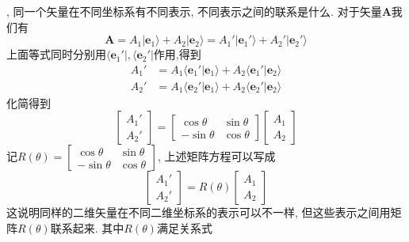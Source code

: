 \documentclass[a4paper,11pt]{book}
\begin{document}
, 同一个矢量在不同坐标系有不同表示, 不同表示之间的联系是什么. 对于矢量$\mathbf{A}$我们有
\begin{equation*}
  \mathbf{A}=A_1|\mathbf{e}_1\rangle+A_2|\mathbf{e}_2\rangle=A_1'|\mathbf{e}_1'\rangle+A_2'|\mathbf{e}_2'\rangle
\end{equation*}
上面等式同时分别用$\langle\mathbf{e}_1'|,\langle\mathbf{e}_2'|$作用,得到
\begin{equation*}
  \begin{split}
     A_1' & =A_1\langle\mathbf{e}_1'|\mathbf{e}_1\rangle+A_2\langle\mathbf{e}_1'|\mathbf{e}_2\rangle \\
     A_2' & =A_1\langle\mathbf{e}_2'|\mathbf{e}_1\rangle+A_2\langle\mathbf{e}_2'|\mathbf{e}_2\rangle
  \end{split}
\end{equation*}
化简得到
\begin{equation*}
  \begin{bmatrix}
    A_1' \\
    A_2'
  \end{bmatrix}=\begin{bmatrix}
                  \cos\theta & \sin\theta \\
                  -\sin\theta & \cos\theta
                \end{bmatrix}\begin{bmatrix}
                               A_1 \\
                               A_2
                             \end{bmatrix}
\end{equation*}
记$R(\theta)=\begin{bmatrix}
              \cos\theta & \sin\theta \\
              -\sin\theta & \cos\theta
            \end{bmatrix}$, 上述矩阵方程可以写成
\begin{equation*}
  \begin{bmatrix}
    A_1' \\
    A_2'
  \end{bmatrix}=R(\theta)\begin{bmatrix}
                           A_1 \\
                           A_2
                         \end{bmatrix}
\end{equation*}
这说明同样的二维矢量在不同二维坐标系的表示可以不一样, 但这些表示之间用矩阵$R(\theta)$联系起来. 其中$R(\theta)$满足关系式
\end{document}
